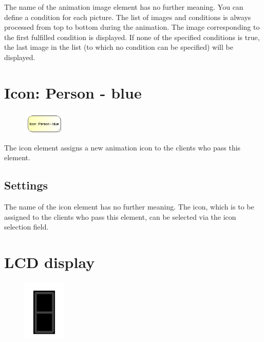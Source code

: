 The name of the animation image element has no further meaning.
You can define a condition for each picture. The list of images and conditions
is always processed from top to bottom during the animation.
The image corresponding to the first fulfilled condition is displayed.
If none of the specified conditions is true, the last image in the list
(to which no condition can be specified) will be displayed.


\section{Icon: Person - blue}
\label{ref:ModelElementClientIcon}

\begin{figure}
\vspace{-22pt}
\includegraphics[width=2cm]{imageModelElementClientIcon.png}
\vspace{-22pt}
\end{figure}

The icon element assigns a new animation icon to the clients who pass this element.

\subsection*{Settings}

The name of the icon element has no further meaning. The icon, which is to be assigned to the
clients who pass this element, can be selected via the icon selection field.


\section{LCD display}
\label{ref:ModelElementAnimationLCD}

\begin{figure}
\vspace{-22pt}
\includegraphics[width=2cm]{imageModelElementAnimationLCD.png}
\vspace{-22pt}
\end{figure}

